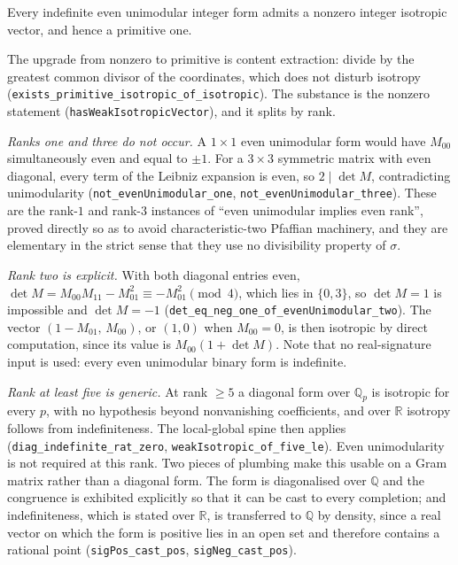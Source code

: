 \begin{proposition}
\label{prop:hm}
Every indefinite even unimodular integer form admits a nonzero integer
isotropic vector, and hence a primitive one.
\end{proposition}

The upgrade from nonzero to primitive is content extraction: divide by
the greatest common divisor of the coordinates, which does not disturb
isotropy (\texttt{exists\_primitive\_isotropic\_of\_isotropic}). The
substance is the nonzero statement (\texttt{hasWeakIsotropicVector}), and
it splits by rank.

\emph{Ranks one and three do not occur.} A $1\times 1$ even unimodular
form would have $M_{00}$ simultaneously even and equal to $\pm 1$. For a
$3\times 3$ symmetric matrix with even diagonal, every term of the
Leibniz expansion is even, so $2 \mid \det M$, contradicting
unimodularity (\texttt{not\_evenUnimodular\_one},
\texttt{not\_evenUnimodular\_three}). These are the rank-$1$ and rank-$3$
instances of ``even unimodular implies even rank'', proved directly so as
to avoid characteristic-two Pfaffian machinery, and they are elementary
in the strict sense that they use no divisibility property of $\sigma$.

\emph{Rank two is explicit.} With both diagonal entries even,
$\det M = M_{00}M_{11} - M_{01}^2 \equiv -M_{01}^2 \pmod 4$, which lies
in $\{0,3\}$, so $\det M = 1$ is impossible and $\det M = -1$
(\texttt{det\_eq\_neg\_one\_of\_evenUnimodular\_two}). The vector
$(1 - M_{01},\, M_{00})$, or $(1,0)$ when $M_{00} = 0$, is then isotropic
by direct computation, since its value is $M_{00}(1 + \det M)$. Note that
no real-signature input is used: every even unimodular binary form is
indefinite.

\emph{Rank at least five is generic.} At rank $\geq 5$ a diagonal form
over $\mathbb{Q}_p$ is isotropic for every $p$, with no hypothesis beyond
nonvanishing coefficients, and over $\mathbb{R}$ isotropy follows from
indefiniteness. The local-global spine then applies
(\texttt{diag\_indefinite\_rat\_zero},
\texttt{weakIsotropic\_of\_five\_le}). Even unimodularity is not required
at this rank. Two pieces of plumbing make this usable on a Gram matrix
rather than a diagonal form. The form is diagonalised over $\mathbb{Q}$
and the congruence is exhibited explicitly so that it can be cast to every
completion; and indefiniteness, which is stated over $\mathbb{R}$, is
transferred to $\mathbb{Q}$ by density, since a real vector on which the
form is positive lies in an open set and therefore contains a rational
point (\texttt{sigPos\_cast\_pos}, \texttt{sigNeg\_cast\_pos}).

